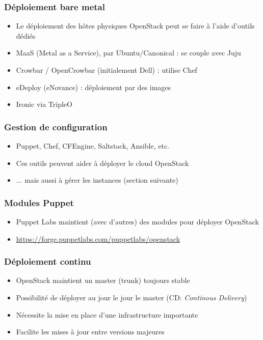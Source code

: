   \begin{frame}
    \frametitle{Déploiement bare metal}
    \begin{itemize}
      \item Le déploiement des hôtes physiques OpenStack peut se faire à l'aide d'outils dédiés\pause
      \item MaaS (Metal as a Service), par Ubuntu/Canonical : se couple avec Juju
      \item Crowbar / OpenCrowbar (initialement Dell) : utilise Chef
      \item eDeploy (eNovance) : déploiement par des images\pause
      \item Ironic via TripleO
    \end{itemize}
  \end{frame}

  \begin{frame}
    \frametitle{Gestion de configuration}
    \begin{itemize}
      \item Puppet, Chef, CFEngine, Saltstack, Ansible, etc.\pause
      \item Ces outils peuvent aider à déployer le cloud OpenStack
      \item ... mais aussi à gérer les instances (section suivante)
    \end{itemize}
  \end{frame}

  \begin{frame}
    \frametitle{Modules Puppet}
    \begin{itemize}
      \item Puppet Labs maintient (avec d'autres) des modules pour déployer OpenStack
      \item \url{https://forge.puppetlabs.com/puppetlabs/openstack}
    \end{itemize}
  \end{frame}

  \begin{frame}
    \frametitle{Déploiement continu}
    \begin{itemize}
      \item OpenStack maintient un master (trunk) toujours stable
      \item Possibilité de déployer au jour le jour le master (CD: \textit{Continous Delivery})
      \item Nécessite la mise en place d'une infrastructure importante
      \item Facilite les mises à jour entre versions majeures
    \end{itemize}
  \end{frame}

